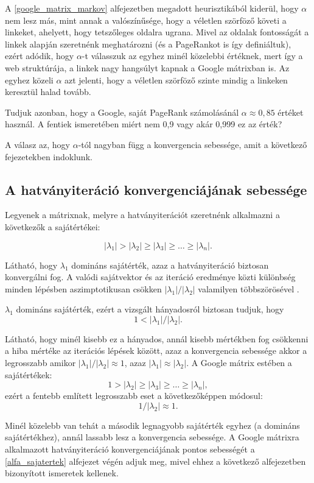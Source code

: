 \documentclass[12pt,a4paper]{article}
\begin{document}
A \ref{google_matrix_markov} alfejezetben megadott heurisztikából kiderül, hogy $\alpha$ nem lesz más, mint annak a valószínűsége, hogy a véletlen szörföző követi a linkeket, ahelyett, hogy tetszőleges oldalra ugrana. Mivel az oldalak fontosságát a linkek alapján szeretnénk meghatározni (és a PageRankot is így definiáltuk), ezért adódik, hogy $\alpha$-t válasszuk az egyhez minél közelebbi értéknek, mert így a web struktúrája, a linkek nagy hangsúlyt kapnak a Google mátrixban is. Az egyhez közeli $\alpha$ azt jelenti, hogy a véletlen szörföző szinte mindig a linkeken keresztül halad tovább.

Tudjuk azonban, hogy a Google, saját PageRank számolásánál $\alpha \approx 0,85$ \cite{lang2} értéket használ. A fentiek ismeretében miért nem 0,9 vagy akár 0,999 ez az érték? 

A válasz az, hogy $\alpha$-tól nagyban függ a konvergencia sebessége, amit a következő fejezetekben indoklunk.

\subsection{A hatványiteráció konvergenciájának sebessége}\label{konvergencia_sebesseg}

Legyenek a mátrixnak, melyre a hatványiterációt szeretnénk alkalmazni a következők a sajátértékei:

\[ |\lambda_1| > |\lambda_2| \geq |\lambda_3| \geq \ldots \geq |\lambda_n|. \] 

Látható, hogy $\lambda_1$ domináns sajátérték, azaz a hatványiteráció biztosan konvergálni fog. A valódi sajátvektor és az iteráció eredménye közti különbség minden lépésben aszimptotikusan csökken $ |\lambda_1| / |\lambda_2|$ valamilyen többszörösével \cite{poweriteration}.

$\lambda_1$ domináns sajátérték, ezért a vizsgált hányadosról biztosan tudjuk, hogy
\[ 1 < |\lambda_1| / |\lambda_2|. \]

Látható, hogy minél kisebb ez a hányados, annál kisebb mértékben fog csökkenni a hiba mértéke az iterációs lépések között, azaz a konvergencia sebessége akkor a legrosszabb amikor $|\lambda_1| / |\lambda_2| \approx 1$, azaz $|\lambda_1| \approx |\lambda_2|$. A Google mátrix estében a sajátértékek:
\[ 1 > |\lambda_2| \geq |\lambda_3| \geq \ldots \geq |\lambda_n|, \]
ezért a fentebb említett legrosszabb eset a következőképpen módosul:
\[ 1 / |\lambda_2| \approx 1. \]

Minél közelebb van tehát a második legnagyobb sajátérték egyhez (a domináns sajátértékhez), annál lassabb lesz a konvergencia sebessége. A Google mátrixra alkalmazott hatványiteráció konvergenciájának pontos sebességét a \ref{alfa_sajatertek} alfejezet végén adjuk meg, mivel ehhez a következő alfejezetben bizonyított ismeretek kellenek.
\end{document}
